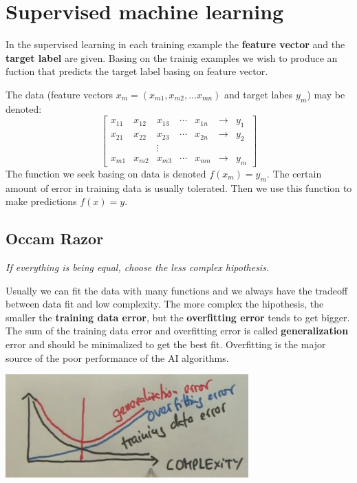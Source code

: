 \documentclass[a4paper,10pt]{article}
\begin{document}
\section{Supervised machine learning}

In the supervised learning in each training example the \textbf{feature vector} and the \textbf{target label} are given. Basing on the trainig examples we wish to produce an fuction that predicts the target label basing on feature vector.

The data (feature vectors $x_m=(x_{m1}, x_{m2}, ... x_{mn})$ and target labes $y_m$) may be denoted:
\[
\left[ \begin{array}{ccccccc}
x_{11} & x_{12} & x_{13} & \cdots & x_{1n} & \rightarrow & y_1 \\
x_{21} & x_{22} & x_{23} & \cdots & x_{2n} & \rightarrow & y_2  \\
	&      & \vdots &      &      &             &      \\
x_{m1} & x_{m2} & x_{m3} & \cdots & x_{mn} & \rightarrow & y_m \end{array} \right]
\]
The function we seek basing on data is denoted $f(x_m)=y_m$. The certain amount of error in training data is usually tolerated. Then we use this function to make predictions $f(x)=y$.

\subsection{Occam Razor}
\begin{center}\textit{If everything is being equal, choose the less complex hipothesis.}\end{center}
Usually we can fit the data with many functions and we always have the tradeoff between data fit and low complexity. The more complex the hipothesis, the smaller the \textbf{training data error}, but the \textbf{overfitting error} tends to get bigger. The sum of the training data error and overfitting error is called \textbf{generalization} error and should be minimalized to get the best fit. Overfitting is the major source of the poor performance of the AI algorithms. 
\vspace{1em}

\begin{center}
\includegraphics[width=0.7\textwidth]{OccamRazor.png}
\end{center}
\end{document}
